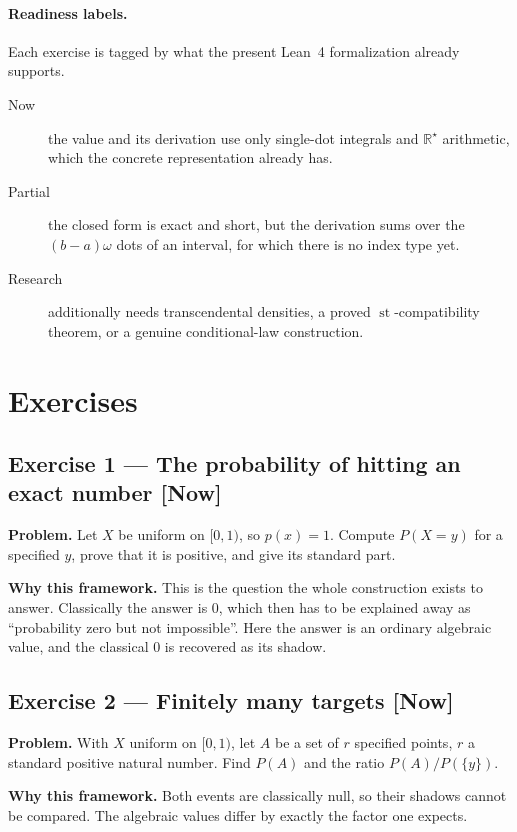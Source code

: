 \documentclass[11pt]{article}
\newcommand{\Rstar}{\mathbb{R}^{\star}}
\newcommand{\st}{\operatorname{st}}
\begin{document}
\paragraph{Readiness labels.} Each exercise is tagged by what the present
Lean~4 formalization already supports.
\begin{description}
\item[Now] the value and its derivation use only single-dot integrals and
$\Rstar$ arithmetic, which the concrete representation already has.
\item[Partial] the closed form is exact and short, but the derivation sums over
the $(b-a)\omega$ dots of an interval, for which there is no index type yet.
\item[Research] additionally needs transcendental densities, a proved
$\st$-compatibility theorem, or a genuine conditional-law construction.
\end{description}


\section*{Exercises}


\subsection*{Exercise 1 --- The probability of hitting an exact number \hfill \normalfont\small[Now]}

\textbf{Problem.} Let $X$ be uniform on $[0,1)$, so $p(x) = 1$. Compute $P(X = y)$
for a specified $y$, prove that it is positive, and give its standard part.

\textbf{Why this framework.} This is the question the whole construction exists to
answer. Classically the answer is $0$, which then has to be explained away as
``probability zero but not impossible''. Here the answer is an ordinary
algebraic value, and the classical $0$ is recovered as its shadow.


\subsection*{Exercise 2 --- Finitely many targets \hfill \normalfont\small[Now]}

\textbf{Problem.} With $X$ uniform on $[0,1)$, let $A$ be a set of $r$ specified
points, $r$ a standard positive natural number. Find $P(A)$ and the ratio
$P(A)/P(\{y\})$.

\textbf{Why this framework.} Both events are classically null, so their shadows
cannot be compared. The algebraic values differ by exactly the factor one
expects.
\end{document}
